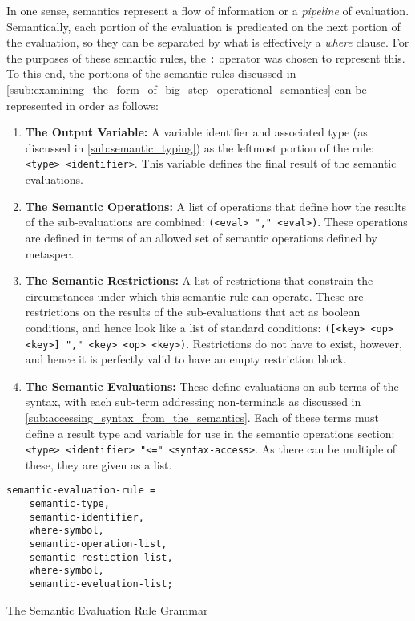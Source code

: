 In one sense, semantics represent a flow of information or a \textit{pipeline} of evaluation. 
Semantically, each portion of the evaluation is predicated on the next portion of the evaluation, so they can be separated by what is effectively a \textit{where} clause. 
For the purposes of these semantic rules, the \texttt{:} operator was chosen to represent this.
To this end, the portions of the semantic rules discussed in \autoref{ssub:examining_the_form_of_big_step_operational_semantics} can be represented in order as follows:
\begin{enumerate}
    \item \textbf{The Output Variable:} A variable identifier and associated type (as discussed in \autoref{sub:semantic_typing}) as the leftmost portion of the rule: \texttt{<type> <identifier>}.
    This variable defines the final result of the semantic evaluations.
    \item \textbf{The Semantic Operations:} A list of operations that define how the results of the sub-evaluations are combined: \texttt{(<eval> {"," <eval>})}.
    These operations are defined in terms of an allowed set of semantic operations defined by metaspec. 
    \item \textbf{The Semantic Restrictions:} A list of restrictions that constrain the circumstances under which this semantic rule can operate.
    These are restrictions on the results of the sub-evaluations that act as boolean conditions, and hence look like a list of standard conditions: \texttt{([<key> <op> <key>] {"," <key> <op> <key>})}.
    Restrictions do not have to exist, however, and hence it is perfectly valid to have an empty restriction block.
    \item \textbf{The Semantic Evaluations:} These define evaluations on sub-terms of the syntax, with each sub-term addressing non-terminals as discussed in \autoref{sub:accessing_syntax_from_the_semantics}. 
    Each of these terms must define a result type and variable for use in the semantic operations section: \texttt{<type> <identifier> "<=" <syntax-access>}.
    As there can be multiple of these, they are given as a list.
\end{enumerate}

\begin{listing}[!htb]
\begin{verbatim}
semantic-evaluation-rule = 
    semantic-type,
    semantic-identifier,
    where-symbol,
    semantic-operation-list,
    semantic-restiction-list,
    where-symbol, 
    semantic-eveluation-list;
\end{verbatim}
\caption{The Semantic Evaluation Rule Grammar}
\label{lst:the_semantic_evaluation_rule_grammar}
\end{listing}

